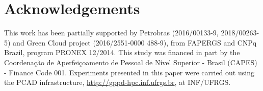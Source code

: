 \documentclass[AMA,final,STIX1COL]{WileyNJD-v2}
\begin{document}


\section*{Acknowledgements}
This work has been partially supported by Petrobras (2016/00133-9, 2018/00263-5) and Green Cloud project (2016/2551-0000 488-9), from FAPERGS and CNPq Brazil, program PRONEX 12/2014. This study was financed in part by the Coordenação de Aperfeiçoamento de Pessoal de Nível Superior - Brasil (CAPES) - Finance Code 001. Experiments presented in this paper were carried out using the PCAD infrastructure, \url{http://gppd-hpc.inf.ufrgs.br}, at INF/UFRGS.


\end{document}
